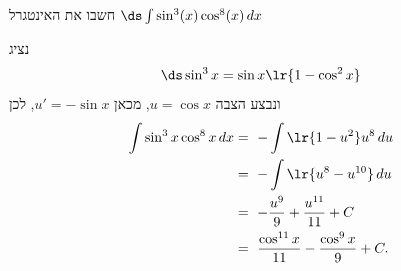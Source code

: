 חשבו את האינטגרל
$\ds \int \sin^3(x)\cos^8(x)\,dx$
\begin{solbox}
נציג $$\ds \sin^3x=\sin x\lr{1-\cos^2x}$$ ונבצע הצבה $u=\cos x$,
מכאן
$u'=-\sin x$,
לכן
\begin{align*}
\int \sin^3x\cos^8x\,dx
&=\ -\int \lr{1-u^2}u^8\,du\\
&=\ -\int \lr{u^8-u^{10}}\,du\\
&=\ -\frac{u^9}{9}+\frac{u^{11}}{11}+C\\
&=\ \frac{\cos^{11}x}{11}-\frac{\cos^9x}{9}+C.
\end{align*}
\end{solbox}
